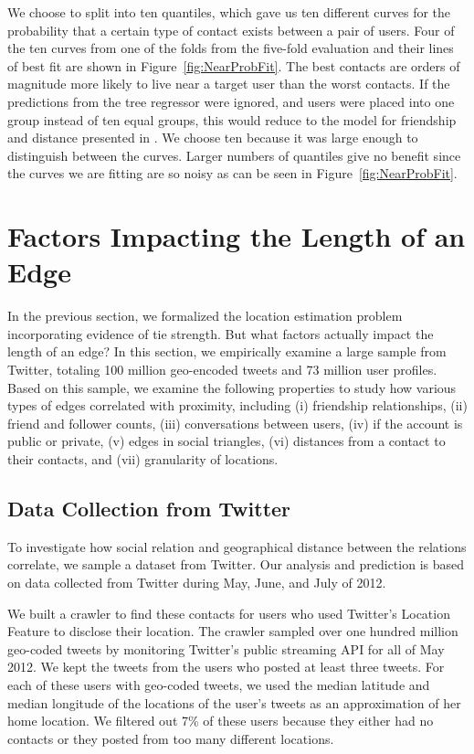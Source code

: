 \documentclass[letterpaper]{article}
\begin{document}
We choose to split into ten quantiles, which gave us ten different curves for
the probability that a certain type of contact exists between a pair of users.
%
Four of the ten curves from one of the folds from the five-fold evaluation and
their lines of best fit are shown in Figure~\ref{fig:NearProbFit}.
%
The best contacts are orders of magnitude more likely to live near a target
user than the worst contacts.
%
If the predictions from the tree regressor were ignored, and users were placed
into one group instead of ten equal groups, this would reduce to the model for
friendship and distance presented in \cite{backstrom2010find}.
%
We choose ten because it was large enough to distinguish between the curves.
%
Larger numbers of quantiles give no benefit since the curves we are fitting
are so noisy as can be seen in Figure~\ref{fig:NearProbFit}.


\section{Factors Impacting the Length of an Edge}
In the previous section, we formalized the location estimation problem
incorporating evidence of tie strength.
%
But what factors actually impact the length of an edge? In this section, we
empirically examine a large sample from Twitter, totaling 100 million
geo-encoded tweets and 73 million user profiles.
%
Based on this sample, we examine the following properties to study how various
types of edges correlated with proximity, including
    (i) friendship relationships,
    (ii) friend and follower counts,
    (iii) conversations between users,
    (iv) if the account is public or private,
    (v) edges in social triangles,
    (vi) distances from a contact to their contacts, and
    (vii) granularity of locations.

\subsection{Data Collection from Twitter}
To investigate how social relation and geographical distance between the
relations correlate, we sample a dataset from Twitter.
%
Our analysis and prediction is based on data collected from Twitter during
May, June, and July of 2012.

We built a crawler to find these contacts for users who used Twitter's Location
Feature to disclose their location.
%
The crawler sampled over one hundred million geo-coded tweets by monitoring
Twitter's public streaming API for all of May 2012.
We kept the tweets from the users who posted at least three tweets.
%
For each of these users with geo-coded tweets, we used the median latitude and
median longitude of the locations of the user's tweets as an approximation of
her home location.
%
We filtered out 7\% of these users because they either had no contacts or they
posted from too many different locations.
\end{document}

